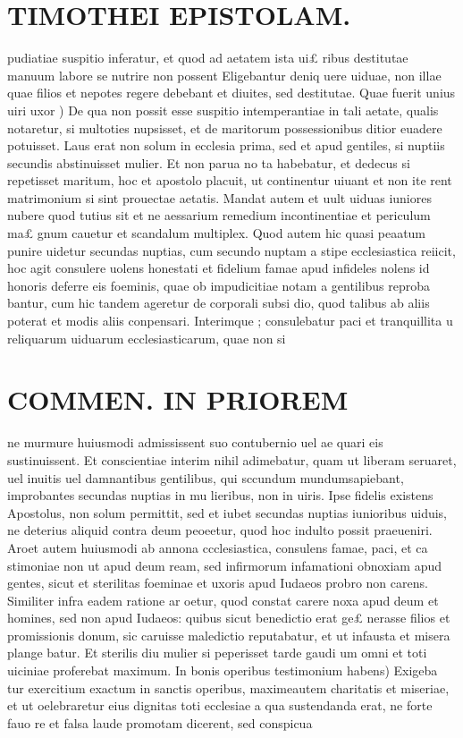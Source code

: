 \documentclass{article}
\begin{document}
\begin{pages}
\section*{TIMOTHEI EPISTOLAM. }
\marginpar{[ p.125 ]}\pstart pudiatiae suspitio inferatur, et quod ad aetatem ista ui£ ribus destitutae manuum labore se nutrire non possent Eligebantur deniq uere uiduae, non illae quae filios et nepotes regere debebant et diuites, sed destitutae.  \pend\pstart Quae fuerit unius uiri uxor ) De qua non possit esse suspitio intemperantiae in tali aetate, qualis notaretur, si multoties nupsisset, et de maritorum possessionibus ditior euadere potuisset. Laus erat non solum in ecclesia prima, sed et apud gentiles, si nuptiis secundis abstinuisset mulier. Et non parua no ta habebatur, et dedecus si repetisset maritum, hoc et apostolo placuit, ut continentur uiuant et non ite rent matrimonium si sint prouectae aetatis. Mandat autem et uult uiduas iuniores nubere quod tutius sit et ne aessarium remedium incontinentiae et periculum ma£ gnum cauetur et scandalum multiplex. Quod autem hic quasi peaatum punire uidetur secundas nuptias, cum secundo nuptam a stipe ecclesiastica reiicit, hoc agit consulere uolens honestati et fidelium famae apud infideles nolens id honoris deferre eis foeminis, quae ob impudicitiae notam a gentilibus reproba bantur, cum hic tandem ageretur de corporali subsi dio, quod talibus ab aliis poterat et modis aliis conpensari. Interimque ; consulebatur paci et tranquillita u reliquarum uiduarum ecclesiasticarum, quae non si  \pend
\section*{COMMEN. IN PRIOREM }
\marginpar{[ p.126 ]}\pstart ne murmure huiusmodi admississent suo contubernio uel ae quari eis sustinuissent. Et conscientiae interim nihil adimebatur, quam ut liberam seruaret, uel inuitis uel damnantibus gentilibus, qui sccundum mundumsapiebant, improbantes secundas nuptias in mu lieribus, non in uiris. Ipse fidelis existens Apostolus, non solum permittit, sed et iubet secundas nuptias iunioribus uiduis, ne deterius aliquid contra deum peoeetur, quod hoc indulto possit praeueniri. Aroet autem huiusmodi ab annona ccclesiastica, consulens famae, paci, et ca stimoniae non ut apud deum ream, sed infirmorum infamationi obnoxiam apud gentes, sicut et sterilitas foeminae et uxoris apud Iudaeos probro non carens. Similiter infra eadem ratione ar oetur, quod constat carere noxa apud deum et homines, sed non apud Iudaeos: quibus sicut benedictio erat ge£ nerasse filios et promissionis donum, sic caruisse maledictio reputabatur, et ut infausta et misera plange batur. Et sterilis diu mulier si peperisset tarde gaudi um omni et toti uiciniae proferebat maximum.  \pend\pstart In bonis operibus testimonium habens) Exigeba tur exercitium exactum in sanctis operibus, maximeautem charitatis et miseriae, et ut oelebraretur eius dignitas toti ecclesiae a qua sustendanda erat, ne forte fauo re et falsa laude promotam dicerent, sed conspicua  \pend

\end{pages}
\end{document}
